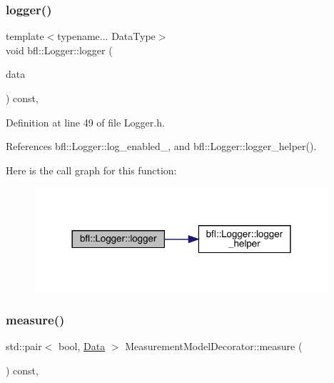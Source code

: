 \subsubsection{\texorpdfstring{logger()}{logger()}\hspace{0.1cm}{\footnotesize\ttfamily [4/4]}}
{\footnotesize\ttfamily template$<$typename... Data\+Type$>$ \\
void bfl\+::\+Logger\+::logger (\begin{DoxyParamCaption}\item[{Data\+Type...}]{data }\end{DoxyParamCaption}) const\hspace{0.3cm}{\ttfamily [inline]}, {\ttfamily [inherited]}}



Definition at line 49 of file Logger.\+h.



References bfl\+::\+Logger\+::log\+\_\+enabled\+\_\+, and bfl\+::\+Logger\+::logger\+\_\+helper().

Here is the call graph for this function\+:
\nopagebreak
\begin{figure}[H]
\begin{center}
\leavevmode
\includegraphics[width=309pt]{classbfl_1_1Logger_a0f0cf7ce956546d94dfb1feb7cebf171_cgraph}
\end{center}
\end{figure}
\mbox{\label{classbfl_1_1MeasurementModelDecorator_a36194c2f6abd7e13a417c3663febe921}} 
\subsubsection{\texorpdfstring{measure()}{measure()}}
{\footnotesize\ttfamily std\+::pair$<$ bool, \mbox{\hyperlink{namespacebfl_af6b103c6821db1b54452f776fdd9dd02}{Data}} $>$ Measurement\+Model\+Decorator\+::measure (\begin{DoxyParamCaption}{ }\end{DoxyParamCaption}) const\hspace{0.3cm}{\ttfamily [override]}, {\ttfamily [virtual]}}



